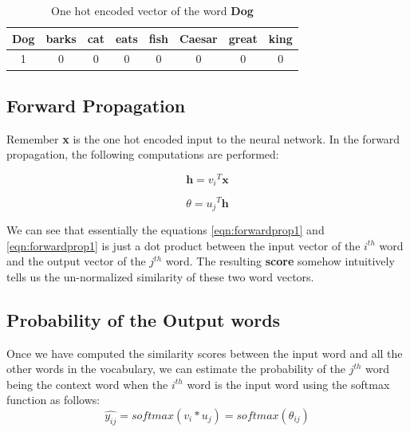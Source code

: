 \begin{table}
  \centering
  \begin{tabular}{|c|c|c|c|c|c|c|c|}
  \hline
       Dog&barks&cat&eats&fish&Caesar&great&king  \\
       \hline
       1&0&0&0&0&0&0&0 \\
       \hline
  \end{tabular}
  \caption{One hot encoded vector of the word \textbf{Dog}}
  \label{tab:dogtable}
\end{table}






\subsection{Forward Propagation}
Remember \textbf{x} is the one hot encoded input to the neural network. In the forward propagation, the following computations are performed:

\begin{equation}
    \textbf{h} = \textbf{$v_{i}$}^T \textbf{x}
    \label{eqn:forwardprop1}
\end{equation}

\begin{equation}
    \textbf{$\theta$}=\textbf{$u_{j}$}^T \textbf{h}     
    \label{eqn:forwardprop2}
\end{equation}

We can see that essentially the equations \ref{eqn:forwardprop1} and \ref{eqn:forwardprop1} is just a dot product between the input vector of the $i^{th}$ word and the output vector of the $j^{th}$ word. The resulting \textbf{score} somehow intuitively tells us the un-normalized similarity of these two word vectors.

\subsection{Probability of the Output words}
Once we have computed the similarity scores between the input word and all the other words in the vocabulary, we can estimate the probability of the $j^{th} $ word being the context word when the $i^{th} $ word is the input word using the softmax function as follows:
\begin{equation}
    \hat{y_{ij}}=softmax(v_i*u_j)=softmax(\theta_{ij})
    \label{eqn:probestimate}
\end{equation}

